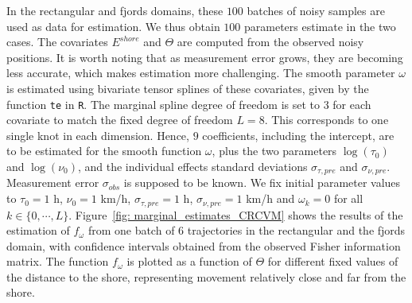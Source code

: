 \documentclass[11pt]{article}
\newcommand {\1}{\mathbb{1}}
\theoremstyle{definition}
\theoremstyle{remark}
\theoremstyle{remark}
\begin{document}

In the rectangular and fjords domains, these $100$ batches of noisy samples are used as data for estimation. We thus obtain $100$ parameters estimate in the two cases. The covariates $E^{shore}$ and $\Theta$ are computed from the observed noisy positions. It is worth noting that as measurement error grows, they are becoming less accurate, which makes estimation more challenging. The smooth parameter $\omega$ is estimated using bivariate tensor splines of these covariates, given by the function \texttt{te} in \texttt{R}. The marginal spline degree of freedom is set to $3$ for each covariate to match the fixed degree of freedom $L=8$. This corresponds to one single knot in each dimension. Hence, $9$ coefficients, including the intercept, are to be estimated for the smooth function $\omega$, plus the two parameters $\log(\tau_0)$ and $\log(\nu_0)$, and the individual effects standard deviations $\sigma_{\tau,pre}$ and $\sigma_{\nu,pre}$. Measurement error $\sigma_{obs}$ is supposed to be known. 
We fix initial parameter values to $\tau_{0}=1$ h, $\nu_{0} = 1$ km/h, $\sigma_{\tau,pre}=1$ h, $\sigma_{\nu,pre}=1$ km/h and $\omega_k=0$ for all $k \in \{0,\cdots,L\}$. Figure~\ref{fig: marginal_estimates_CRCVM} shows the results of the estimation of $f_{\omega}$ from one batch of $6$ trajectories in the rectangular and the fjords domain, with confidence intervals obtained from the observed Fisher information matrix. The function $f_{\omega}$  is plotted as a function of $\Theta$ for different fixed values of the distance to the shore, representing movement relatively close and far from the shore.
\end{document}
